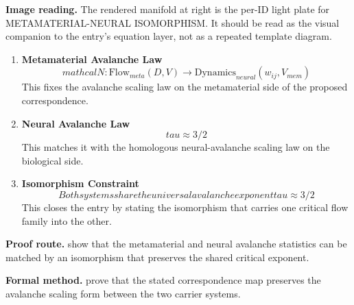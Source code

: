 \begin{samepage}
\noindent\begin{minipage}[t]{0.45\linewidth}
\vspace{0pt}
\raggedright
\scriptsize\textbf{Image reading.} The rendered manifold at right is the per-ID light plate for METAMATERIAL-NEURAL ISOMORPHISM. It should be read as the visual companion to the entry's equation layer, not as a repeated template diagram.\par
\end{minipage}\hfill
\begin{minipage}[t]{0.53\linewidth}
\vspace*{-0.10in}
\raggedright
{}
\end{minipage}
\end{samepage}

\clearpage


\begin{enumerate}[leftmargin=1.6em,itemsep=9pt,topsep=6pt]
\item \textbf{Metamaterial Avalanche Law}
\[
mathcal{N}: \text{Flow}_{meta}(D, V) \to \text{Dynamics}_{neural}(w_{ij}, V_{mem})
\]
This fixes the avalanche scaling law on the metamaterial side of the proposed correspondence.

\item \textbf{Neural Avalanche Law}
\[
tau \approx 3/2
\]
This matches it with the homologous neural-avalanche scaling law on the biological side.

\item \textbf{Isomorphism Constraint}
\[
Both systems share the universal avalanche exponent tau \approx 3/2
\]
This closes the entry by stating the isomorphism that carries one critical flow family into the other.
\end{enumerate}

\textbf{Proof route.} show that the metamaterial and neural avalanche statistics can be matched by an isomorphism that preserves the shared critical exponent.

\textbf{Formal method.} prove that the stated correspondence map preserves the avalanche scaling form between the two carrier systems.

\medskip
{}

